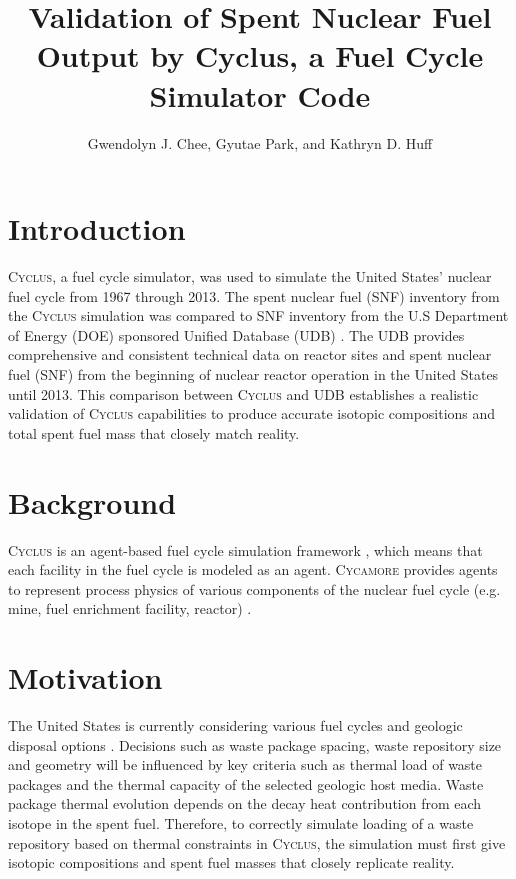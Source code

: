 \documentclass{anstrans}
\title{Validation of Spent Nuclear Fuel Output by Cyclus, a Fuel Cycle Simulator Code}
\author{Gwendolyn J. Chee, Gyutae Park, and Kathryn D. Huff}
\institute{
Dept. of Nuclear, Plasma and Radiological Engineering, University of Illinois at Urbana-Champaign \\
gchee2@illinois.edu
}
\newcommand{\Cyclus}{\textsc{Cyclus}\xspace}%
\newcommand{\Cycamore}{\textsc{Cycamore}\xspace}%
\begin{document}
\section{Introduction}
\Cyclus \cite{carlsen_cyclus_2014}, a fuel cycle simulator, was used to simulate the
United States' nuclear fuel cycle from 1967 through 2013. The spent nuclear fuel (SNF) inventory from the \Cyclus simulation was compared to SNF inventory from the U.S Department of Energy (DOE) sponsored Unified Database (UDB) \cite{peterson_unf-st&dards_2017}. The UDB provides comprehensive and consistent technical data on reactor sites and spent nuclear fuel (SNF) from the beginning of nuclear reactor operation in the United States until 2013. This comparison between \Cyclus and UDB establishes a realistic validation of \Cyclus capabilities to produce accurate isotopic compositions and total spent fuel mass that closely match reality. 

\section{Background}
\Cyclus is an agent-based fuel cycle simulation framework \cite{huff_fundamental_2016}, which means that each facility in the fuel cycle is modeled as an agent. \Cycamore \cite{carlsen_cycamore_2014} provides agents to represent process physics of various components of the nuclear fuel cycle (e.g. mine, fuel enrichment facility, reactor) \cite{huff_extensions_2014}. 

\section{Motivation}
The United States is currently considering various fuel cycles and geologic disposal options
\cite{DOE_strategy_2013}. Decisions such as waste package spacing, waste repository size and geometry will be influenced by key criteria such as thermal load of waste packages and the thermal capacity of the selected geologic host media. Waste package thermal evolution depends on the decay heat contribution from each isotope in the spent fuel. Therefore, to correctly simulate loading of a waste repository based on thermal constraints in \Cyclus, the simulation must first give isotopic compositions and spent fuel masses that closely replicate reality. 

\end{document}
